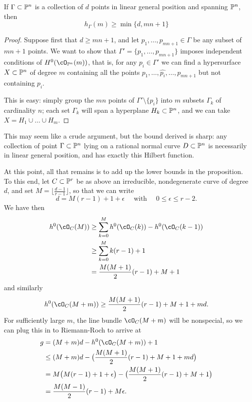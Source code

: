 \begin{proposition}
If $\Gamma \subset \PP^n$ is a collection of $d$ points in linear general position and spanning $\PP^n$, then 
$$
h_\Gamma(m) \geq \min\{d, mn+1\}
$$
\end{proposition}

\begin{proof}
Suppose first that $d \geq mn+1$, and let $p_1,\dots,p_{mn+1} \in \Gamma$ be any subset of $mn+1$ points. We want to show that $\Gamma' = \{p_1,\dots,p_{mn+1}\}$ imposes independent conditions of $H^0(\cO_{\PP^n}(m))$, that is, for any $p_i \in \Gamma'$ we can find a hypersurface $X \subset \PP^n$ of degree $m$ containing all the points $p_1,\dots, \hat{p_i},\dots,p_{mn+1}$ but not containing $p_i$.

This is easy: simply group the $mn$ points of $\Gamma' \setminus \{p_i\}$ into $m$ subsets $\Gamma_k$ of cardinality $n$; each set $\Gamma_k$ will span a hyperplane $H_k \subset \PP^n$, and we can take $X = H_1 \cup \dots \cup H_m$. 
\end{proof}

This may seem like a crude argument, but the bound derived is sharp: any collection of point $\Gamma \subset \PP^n$ lying on a rational normal curve $D \subset \PP^n$ is necessarily in linear general position, and has exactly this Hilbert function.

At this point, all that remains is to add up the lower bounds in the proposition. To this end, let $C \subset \PP^r$ be as above an irreducible, nondegenerate curve of degree $d$, and set $M = \lfloor{\frac{d-1}{r-1}}\rfloor$, so that we can write
$$
d = M(r-1) + 1 + \epsilon \quad \text{ with } \quad 0 \leq \epsilon \leq r-2.
$$
We have then
\begin{align*}
h^0(\cO_C(M)) &\geq \sum_{k=0}^M h^0(\cO_C(k)) - h^0(\cO_C(k-1)) \\
&\geq  \sum_{k=0}^M k(r-1)+1 \\
&= \frac{M(M+1)}{2}(r-1) + M + 1
\end{align*}
and similarly
$$
h^0(\cO_C(M+m)) \geq \frac{M(M+1)}{2}(r-1) + M + 1 + md.
$$
For sufficiently large $m$, the line bundle $\cO_C(M+m)$ will be nonspecial, so we can plug this in to Riemann-Roch to arrive at
\begin{align*}
g &= (M+m)d - h^0(\cO_C(M+m)) + 1 \\
&\leq (M+m)d - \bigl(  \frac{M(M+1)}{2}(r-1) + M + 1 + md \bigr) \\
& = M\bigl( M(r-1) + 1 + \epsilon \bigr) - \bigl(  \frac{M(M+1)}{2}(r-1) + M + 1 \bigr) \\
&= \frac{M(M-1)}{2}(r-1) + M\epsilon.
\end{align*}

